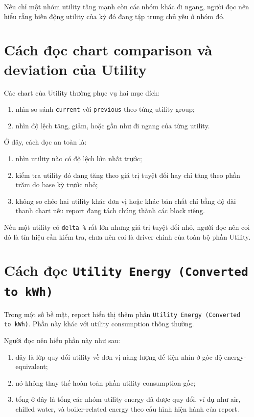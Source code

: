 Nếu chỉ một nhóm utility tăng mạnh còn các nhóm khác đi ngang, người đọc nên hiểu rằng biến động utility của kỳ đó đang tập trung chủ yếu ở nhóm đó.

\section{Cách đọc chart comparison và deviation của Utility}

Các chart của Utility thường phục vụ hai mục đích:

\begin{enumerate}[label=-]
\item nhìn so sánh \texttt{current} với \texttt{previous} theo từng utility group;
\item nhìn độ lệch tăng, giảm, hoặc gần như đi ngang của từng utility.
\end{enumerate}

Ở đây, cách đọc an toàn là:

\begin{enumerate}[label=-]
\item nhìn utility nào có độ lệch lớn nhất trước;
\item kiểm tra utility đó đang tăng theo giá trị tuyệt đối hay chỉ tăng theo phần trăm do base kỳ trước nhỏ;
\item không so chéo hai utility khác đơn vị hoặc khác bản chất chỉ bằng độ dài thanh chart nếu report đang tách chúng thành các block riêng.
\end{enumerate}

Nếu một utility có \texttt{delta \%} rất lớn nhưng giá trị tuyệt đối nhỏ, người đọc nên coi đó là tín hiệu cần kiểm tra, chưa nên coi là driver chính của toàn bộ phần Utility.

\section{Cách đọc \texttt{Utility Energy (Converted to kWh)}}

Trong một số bề mặt, report hiển thị thêm phần \texttt{Utility Energy (Converted to kWh)}. Phần này khác với utility consumption thông thường.

Người đọc nên hiểu phần này như sau:

\begin{enumerate}[label=-]
\item đây là lớp quy đổi utility về đơn vị năng lượng để tiện nhìn ở góc độ energy-equivalent;
\item nó không thay thế hoàn toàn phần utility consumption gốc;
\item tổng ở đây là tổng các nhóm utility energy đã được quy đổi, ví dụ như air, chilled water, và boiler-related energy theo cấu hình hiện hành của report.
\end{enumerate}

